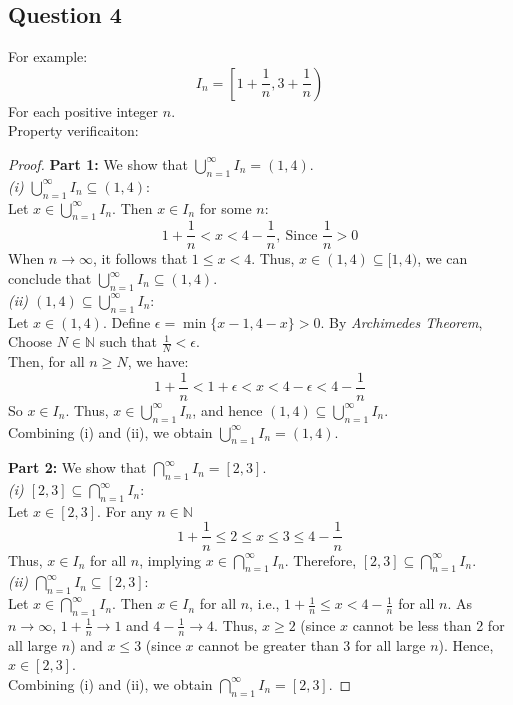 \documentclass{article}
\begin{document}
\subsection*{Question 4}
For example:
\[ I_n = \left[ 1 + \frac{1}{n}, 3 + \frac{1}{n} \right) \]
For each positive integer $n$.
\\
Property verificaiton:
\begin{proof}
    \textbf{Part 1:} We show that \(\displaystyle \bigcup_{n=1}^{\infty} I_n = (1, 4)\).
    \\
    \textit{(i) \(\bigcup_{n=1}^{\infty} I_n \subseteq (1, 4)\)}: 
    \\
    Let \( x \in \bigcup_{n=1}^{\infty} I_n \). Then \( x \in I_n \) for some \( n \):
    \[ 1 + \frac{1}{n} < x < 4 - \frac{1}{n}, \ \text{Since } \frac{1}{n} > 0 \]
    When $n \rightarrow \infty$, it follows that \( 1 \leq x < 4 \). Thus, \( x \in (1, 4) \subseteq [1, 4) \), we can conclude that \(\bigcup_{n=1}^{\infty} I_n \subseteq (1, 4)\).
    \\
    \textit{(ii) \((1, 4) \subseteq \bigcup_{n=1}^{\infty} I_n\)}:
    \\
    Let \( x \in (1, 4) \). Define \( \epsilon = \min\{ x - 1, 4 - x \} > 0 \). By \textit{Archimedes Theorem}, Choose \( N \in \mathbb{N} \) such that \( \frac{1}{N} < \epsilon \). 
    \\
    Then, for all \( n \geq N \), we have:
    \[ 1 + \frac{1}{n} < 1 + \epsilon < x < 4 - \epsilon < 4 - \frac{1}{n}   \]
    So \( x \in I_n \). Thus, \( x \in \bigcup_{n=1}^{\infty} I_n \), and hence \((1, 4) \subseteq \bigcup_{n=1}^{\infty} I_n\).
    \\
    Combining (i) and (ii), we obtain \(\bigcup_{n=1}^{\infty} I_n = (1, 4)\).
    
    \medskip
    
    \textbf{Part 2:} We show that \(\displaystyle \bigcap_{n=1}^{\infty} I_n = [2, 3]\).
    \\
    \textit{(i) \([2, 3] \subseteq \bigcap_{n=1}^{\infty} I_n\)}:  
    \\
    Let \( x \in [2, 3] \). For any \( n \in \mathbb{N} \)
    \[ 1 + \frac{1}{n} \leq 2 \leq x \leq 3 \leq 4 - \frac{1}{n} \]
    Thus, \( x \in I_n \) for all \( n \), implying \( x \in \bigcap_{n=1}^{\infty} I_n \). Therefore, \([2, 3] \subseteq \bigcap_{n=1}^{\infty} I_n\).
    \\
    \textit{(ii) \(\bigcap_{n=1}^{\infty} I_n \subseteq [2, 3]\)}:  
    \\
    Let \( x \in \bigcap_{n=1}^{\infty} I_n \). Then \( x \in I_n \) for all \( n \), i.e., \( 1 + \frac{1}{n} \leq x < 4 - \frac{1}{n} \) for all \( n \). As \( n \to \infty \), \( 1 + \frac{1}{n} \to 1 \) and \( 4 - \frac{1}{n} \to 4 \). Thus, \( x \geq 2 \) (since \( x \) cannot be less than 2 for all large \( n \)) and \( x \leq 3 \) (since \( x \) cannot be greater than 3 for all large \( n \)). Hence, \( x \in [2, 3] \).
    \\
    Combining (i) and (ii), we obtain \(\bigcap_{n=1}^{\infty} I_n = [2, 3]\).
    
\end{proof}
\end{document}

